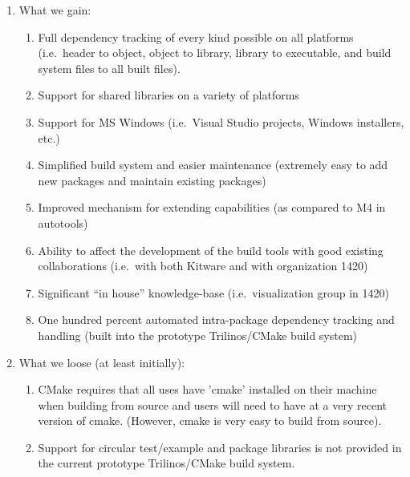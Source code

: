 \documentclass[pdf,ps2pdf,11pt]{SANDreport}
\begin{document}
\begin{enumerate}

{}\item What we gain:

  \begin{enumerate}

  {}\item Full dependency tracking of every kind possible on all
  platforms (i.e.\ header to object, object to library, library to
  executable, and build system files to all built files).

  {}\item Support for shared libraries on a variety of platforms

  {}\item Support for MS Windows (i.e.\ Visual Studio projects,
  Windows installers, etc.)

  {}\item Simplified build system and easier maintenance (extremely
  easy to add new packages and maintain existing packages)

  {}\item Improved mechanism for extending capabilities (as compared
  to M4 in autotools)

  {}\item Ability to affect the development of the build tools with
  good existing collaborations (i.e.\ with both Kitware and with
  organization 1420)

  {}\item Significant ``in house'' knowledge-base (i.e.\ visualization
  group in 1420)

  {}\item One hundred percent automated intra-package dependency
  tracking and handling (built into the prototype Trilinos/CMake build
  system)

  \end{enumerate}

{}\item What we loose (at least initially):

  \begin{enumerate}

  {}\item CMake requires that all uses have 'cmake' installed on their
  machine when building from source and users will need to have at a
  very recent version of cmake. (However, cmake is very easy to build
  from source).

  {}\item Support for circular test/example and package libraries is
  not provided in the current prototype Trilinos/CMake build system.

  \end{enumerate}

\end{enumerate}
\end{document}
